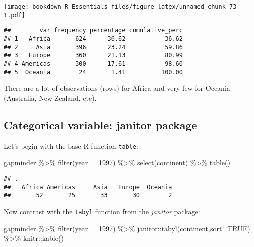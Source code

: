 \documentclass[
]{book}
\newenvironment{Shaded}{\begin{snugshade}}{\end{snugshade}}
\newcommand{\AttributeTok}[1]{\textcolor[rgb]{0.77,0.63,0.00}{#1}}
\newcommand{\ConstantTok}[1]{\textcolor[rgb]{0.00,0.00,0.00}{#1}}
\newcommand{\DecValTok}[1]{\textcolor[rgb]{0.00,0.00,0.81}{#1}}
\newcommand{\FunctionTok}[1]{\textcolor[rgb]{0.00,0.00,0.00}{#1}}
\newcommand{\NormalTok}[1]{#1}
\newcommand{\SpecialCharTok}[1]{\textcolor[rgb]{0.00,0.00,0.00}{#1}}
\begin{document}
\texttt{[image: bookdown-R-Essentials\_files/figure-latex/unnamed-chunk-73-1.pdf]}

\begin{verbatim}
##        var frequency percentage cumulative_perc
## 1   Africa       624      36.62           36.62
## 2     Asia       396      23.24           59.86
## 3   Europe       360      21.13           80.99
## 4 Americas       300      17.61           98.60
## 5  Oceania        24       1.41          100.00
\end{verbatim}

There are a lot of observations (rows) for Africa and very few for Oceania (Australia, New Zealand, etc).

\hypertarget{categorical-variable-janitor-package}{%
\subsection{Categorical variable: janitor package}\label{categorical-variable-janitor-package}}

Let's begin with the base R function \texttt{table}:

\begin{Shaded}
\begin{Highlighting}[]
\NormalTok{gapminder }\SpecialCharTok{\%\textgreater{}\%} 
  \FunctionTok{filter}\NormalTok{(year}\SpecialCharTok{==}\DecValTok{1997}\NormalTok{) }\SpecialCharTok{\%\textgreater{}\%}
  \FunctionTok{select}\NormalTok{(continent) }\SpecialCharTok{\%\textgreater{}\%}
  \FunctionTok{table}\NormalTok{()}
\end{Highlighting}
\end{Shaded}

\begin{verbatim}
## .
##   Africa Americas     Asia   Europe  Oceania 
##       52       25       33       30        2
\end{verbatim}

Now contrast with the \texttt{tabyl} function from the \emph{janitor} package:

\begin{Shaded}
\begin{Highlighting}[]
\NormalTok{gapminder }\SpecialCharTok{\%\textgreater{}\%} 
  \FunctionTok{filter}\NormalTok{(year}\SpecialCharTok{==}\DecValTok{1997}\NormalTok{) }\SpecialCharTok{\%\textgreater{}\%}
\NormalTok{  janitor}\SpecialCharTok{::}\FunctionTok{tabyl}\NormalTok{(continent,}\AttributeTok{sort=}\ConstantTok{TRUE}\NormalTok{) }\SpecialCharTok{\%\textgreater{}\%}
\NormalTok{  knitr}\SpecialCharTok{::}\FunctionTok{kable}\NormalTok{()}
\end{Highlighting}
\end{Shaded}
\end{document}
